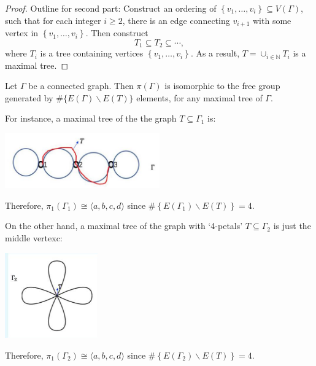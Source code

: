 \begin{proof} Outline for second part: Construct an ordering of \(\left\{  {{v}_{1},\ldots,{v}_{i}}\right\}   \subseteq  V\left( \Gamma \right)\), such that for each integer \(i \geq  2\), there is an edge connecting \({v}_{i + 1}\) with some vertex in \(\left\{  {{v}_{1},\ldots,{v}_{i}}\right\}\).
Then construct 
\[{T}_{1} \subseteq  {T}_{2} \subseteq  \cdots,\] 
where \({T}_{i}\) is a tree containing vertices \(\left\{  {{v}_{1},\ldots,{v}_{i}}\right\}\). As a result, \(T = { \cup  }_{i \in  \mathbb{N}}{T}_{i}\) is a maximal tree.
\end{proof}


\begin{theorem} Let \(\Gamma\) be a connected graph. Then \(\pi \left( \Gamma \right)\) is isomorphic to the free group generated by \(\# \{ E\left( \Gamma \right)  \smallsetminus  E\left( T\right) \}\) elements, for any maximal tree of \(\Gamma\).
\end{theorem}


For instance, a maximal tree of the the graph \(T \subseteq  {\Gamma }_{1}\) is: 
\begin{center}
\includegraphics[width=0.5\textwidth]{images/Ch8_maximal_tree.jpg}
\end{center}
Therefore, \({\pi }_{1}\left( {\Gamma }_{1}\right)  \cong  \langle a,b,c,d\rangle\) since \(\# \left\{  {E\left( {\Gamma }_{1}\right)  \smallsetminus  E\left( T\right) }\right\}   = 4\).

On the other hand, a maximal tree of the graph with `4-petals' \(T \subseteq  {\Gamma }_{2}\) is just the middle vertexc:
\begin{center}
\includegraphics[width=0.3\textwidth]{images/Ch8_4_petals.jpg}
\end{center}
Therefore, \({\pi }_{1}\left( {\Gamma }_{2}\right)  \cong  \langle a,b,c,d\rangle\) since \(\# \left\{  {E\left( {\Gamma }_{2}\right)  \smallsetminus  E\left( T\right) }\right\}   = 4\).

